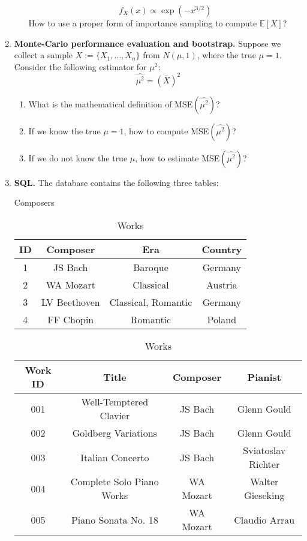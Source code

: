 \documentclass[11pt]{article}
\newcommand{\ep}{\mathbb{E}}
\begin{document}
\begin{enumerate}
\begin{enumerate}
		$$
		f_X(x)\propto \exp\left(-x^{3/2}\right)
		$$
		How to use a proper form of importance sampling to compute $\ep[X]$?
	\end{enumerate}
	\item {\bf Monte-Carlo performance evaluation and bootstrap.} Suppose we collect a sample $X:=\{X_1,\ldots,X_n\}$ from $N(\mu, 1)$, where the true $\mu=1$. Consider the following estimator for $\mu^2$:
	$$
	\widehat{\mu^2} = \left(\bar{X}\right)^2
	$$
	\begin{enumerate}
		\item What is the mathematical definition of MSE$(\widehat{\mu^2})$?
		\item If we know the true $\mu=1$, how to compute MSE$(\widehat{\mu^2})$?
		\item If we do not know the true $\mu$, how to estimate MSE$(\widehat{\mu^2})$?
	\end{enumerate}
	\newpage
	\item {\bf SQL.} The database contains the following three tables:
	\begin{table}[H]
		\centering
		\caption{Composers}
		\begin{tabular}{cccc}\hline
			ID & Composer & Era & Country\\\hline
			1  & JS Bach  & Baroque & Germany\\
			2  & WA Mozart & Classical & Austria\\
			3  & LV Beethoven & Classical, Romantic & Germany\\
			4  & FF Chopin & Romantic & Poland\\\hline
		\end{tabular}
		\caption{Works}
		\begin{tabular}{cccc}\hline
			Work ID & Title & Composer & Pianist\\\hline
			001 & Well-Temptered Clavier & JS Bach & Glenn Gould\\
			002 & Goldberg Variations & JS Bach & Glenn Gould\\
			003 & Italian Concerto & JS Bach & Sviatoslav Richter\\
			004 & Complete Solo Piano Works & WA Mozart & Walter Gieseking\\
			005 & Piano Sonata No. 18 & WA Mozart & Claudio Arrau\\

\end{tabular}
\end{table}
\end{enumerate}
\end{document}
